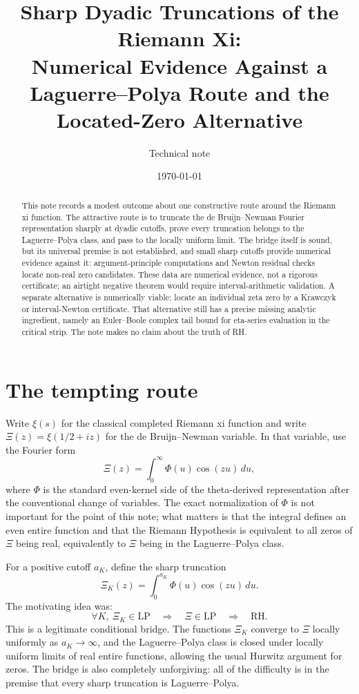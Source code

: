\documentclass[11pt]{article}
\title{Sharp Dyadic Truncations of the Riemann Xi:\\
Numerical Evidence Against a Laguerre--Polya Route and the Located-Zero Alternative}
\author{Technical note}
\date{\today}
\newcommand{\RH}{\mathrm{RH}}
\newcommand{\LP}{\mathrm{LP}}
\newcommand{\dd}{\,d}
\begin{document}
\maketitle

\begin{abstract}
This note records a modest outcome about one constructive route around the
Riemann xi function.  The attractive route is to truncate the de
Bruijn--Newman Fourier representation sharply at dyadic cutoffs, prove every
truncation belongs to the Laguerre--Polya class, and pass to the locally
uniform limit.  The bridge itself is sound, but its universal premise is
not established, and small sharp cutoffs provide numerical evidence against it:
argument-principle computations and Newton residual checks locate non-real
zero candidates.  These data are numerical evidence, not a rigorous
certificate; an airtight negative theorem would require interval-arithmetic
validation.  A separate alternative is numerically viable: locate an
individual zeta zero by a Krawczyk or interval-Newton certificate.  That
alternative still has a precise missing analytic ingredient, namely an
Euler--Boole complex tail bound for eta-series evaluation in the critical
strip.  The note makes no claim about the truth of RH.
\end{abstract}

\section{The tempting route}

Write $\xi(s)$ for the classical completed Riemann xi function and write
$\Xi(z)=\xi(1/2+iz)$ for the de Bruijn--Newman variable.  In that variable,
use the Fourier form
$$
\Xi(z)=\int_0^\infty \Phi(u)\cos(zu)\dd u,
$$
where $\Phi$ is the standard even-kernel side of the theta-derived
representation after the conventional change of variables.  The exact
normalization of $\Phi$ is not important for the point of this note; what
matters is that the integral defines an even entire function and that the
Riemann Hypothesis is equivalent to all zeros of $\Xi$ being real,
equivalently to $\Xi$ being in the Laguerre--Polya class.

For a positive cutoff $a_K$, define the sharp truncation
$$
\Xi_K(z)=\int_0^{a_K}\Phi(u)\cos(zu)\dd u .
$$
The motivating idea was:
$$
  \forall K,\ \Xi_K\in \LP
  \quad\Longrightarrow\quad
  \Xi\in \LP
  \quad\Longrightarrow\quad
  \RH .
$$
This is a legitimate conditional bridge.  The functions $\Xi_K$ converge to
$\Xi$ locally uniformly as $a_K\to\infty$, and the Laguerre--Polya class is
closed under locally uniform limits of real entire functions, allowing the
usual Hurwitz argument for zeros.  The bridge is also completely unforgiving:
all of the difficulty is in the premise that every sharp truncation is
Laguerre--Polya.
\end{document}
